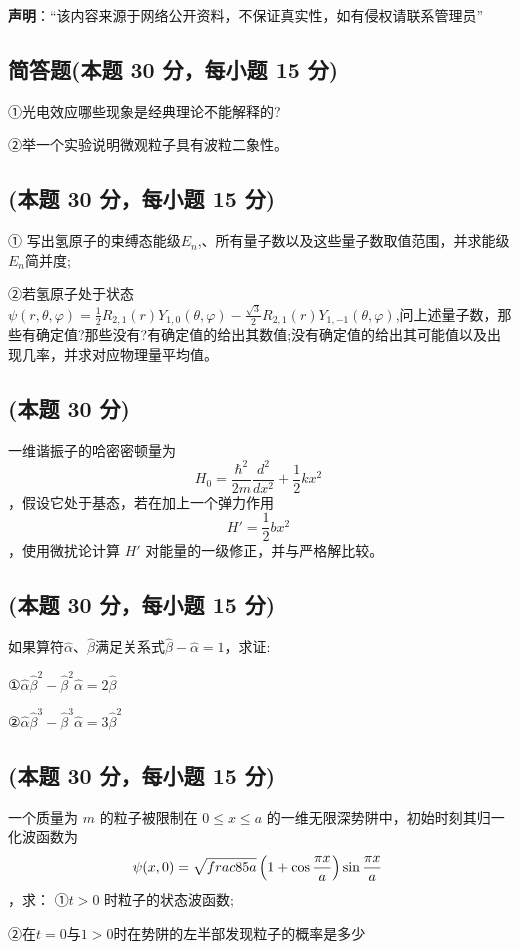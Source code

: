 
\textbf{声明}：“该内容来源于网络公开资料，不保证真实性，如有侵权请联系管理员”

\subsection{简答题(本题 30 分，每小题 15 分)}
①光电效应哪些现象是经典理论不能解释的?

②举一个实验说明微观粒子具有波粒二象性。

\subsection{(本题 30 分，每小题 15 分)}
① 写出氢原子的束缚态能级$E_n$,、所有量子数以及这些量子数取值范围，并求能级$E_n$简并度;

②若氢原子处于状态$\psi(r, \theta, \varphi) = \frac{1}{2} R_{2,1}(r) Y_{1,0}(\theta, \varphi) - \frac{\sqrt{3}}{2} R_{2,1}(r) Y_{1,-1}(\theta, \varphi)$,问上述量子数，那些有确定值?那些没有?有确定值的给出其数值;没有确定值的给出其可能值以及出现几率，并求对应物理量平均值。

\subsection{(本题 30 分)}
一维谐振子的哈密密顿量为 $$ H_0 = \frac{\hbar^2}{2m} \frac{d^2}{dx^2} + \frac{1}{2} k x^2~$$，假设它处于基态，若在加上一个弹力作用$$H' = \frac{1}{2} b x^2~$$，使用微扰论计算 $H'$ 对能量的一级修正，并与严格解比较。

\subsection{(本题 30 分，每小题 15 分)}
如果算符$\hat \alpha$、$\hat \beta$满足关系式$\hat \beta-\hat \alpha=1$，求证:

①$\hat \alpha\hat \beta^2-\hat \beta^2\hat \alpha=2\hat \beta$

②$\hat \alpha\hat \beta^3-\hat \beta^3\hat \alpha=3\hat \beta^2$

\subsection{(本题 30 分，每小题 15 分)}
一个质量为 $m$ 的粒子被限制在 $0 \leq x \leq a$ 的一维无限深势阱中，初始时刻其归一化波函数为 
$$ \psi(x,0) = \sqrt{\\frac{8}{5a}} \left( 1 + \cos \frac{\pi x}{a} \right) \sin \frac{\pi x}{a} ~$$ ，求：
①$t>0$ 时粒子的状态波函数;

②在$t=0$与$1>0$时在势阱的左半部发现粒子的概率是多少